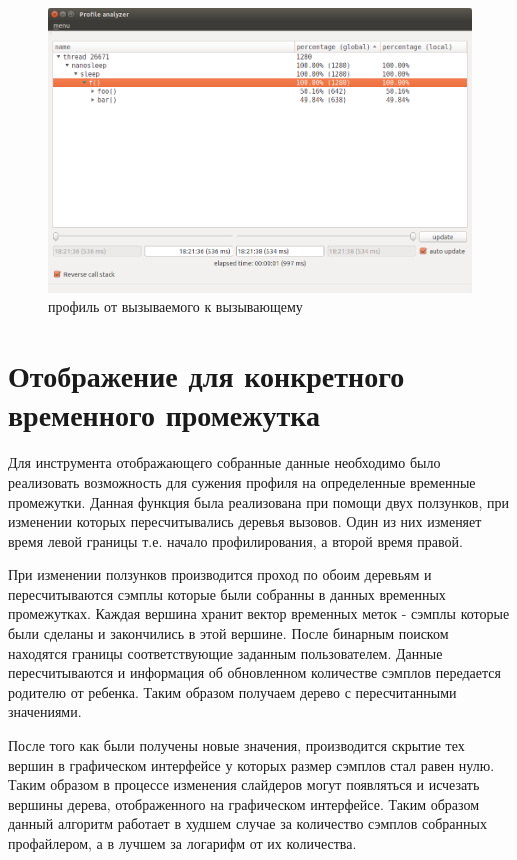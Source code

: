     \begin{figure}[H]
        \caption{профиль от вызываемого к вызывающему}
        \label{fig:down-top}
        \includegraphics[scale=0.47]{images/down-top}
    \end{figure}
    

\section{Отображение для конкретного временного промежутка}
	Для инструмента отображающего собранные данные необходимо было реализовать возможность для сужения профиля на определенные временные промежутки. Данная функция была реализована при помощи двух ползунков, при изменении которых пересчитывались деревья вызовов. Один из них изменяет время левой границы т.е. начало профилирования, а второй время правой.
    
    При изменении ползунков производится проход по обоим деревьям и пересчитываются сэмплы которые были собранны в данных временных промежутках. Каждая вершина хранит вектор временных меток - сэмплы которые были сделаны и закончились в этой вершине. После бинарным поиском находятся границы соответствующие заданным пользователем. Данные пересчитываются и информация об обновленном количестве сэмплов передается родителю от ребенка. Таким образом получаем дерево с пересчитанными значениями.
    
    После того как были получены новые значения, производится скрытие тех вершин в графическом интерфейсе у которых размер сэмплов стал равен нулю. Таким образом в процессе изменения слайдеров могут появляться и исчезать вершины дерева, отображенного на графическом интерфейсе. Таким образом данный алгоритм работает в худшем случае за количество сэмплов собранных профайлером, а в лучшем за логарифм от их количества. 
    
